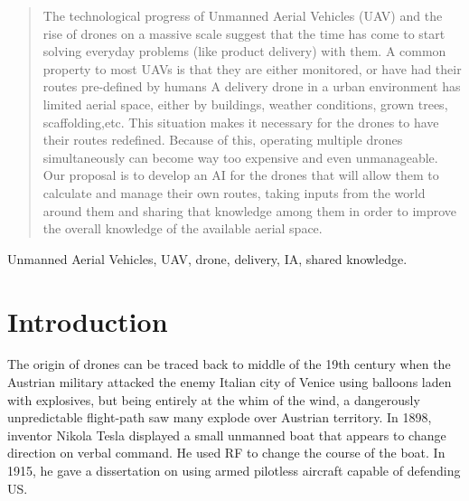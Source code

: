 \documentclass[conference]{IEEEtran}
\begin{document}


\maketitle

\begin{abstract}
The technological progress of Unmanned Aerial Vehicles (UAV) and the rise of drones on a massive scale suggest that the time has come to start solving everyday problems (like product delivery) with them.
A common property to most UAVs is that they are either monitored, or have had their routes pre-defined by humans
A delivery drone in a urban environment has limited aerial space, either by buildings, weather conditions, grown trees, scaffolding,etc.
This situation makes it necessary for the drones to have their routes redefined.
Because of this, operating multiple drones simultaneously can become way too expensive and even unmanageable.
Our proposal is to develop an AI for the drones that will allow them to calculate and manage their own routes, taking inputs from the world around them and sharing that knowledge among them in order to improve the overall knowledge of the available aerial space.
\end{abstract}


\begin{IEEEkeywords}
Unmanned Aerial Vehicles, UAV, drone, delivery, IA, shared knowledge.
\end{IEEEkeywords}


%
\IEEEpeerreviewmaketitle


\section{Introduction}


The origin of drones can be traced back to middle of the 19th century when the Austrian military attacked the enemy Italian city of Venice using balloons laden with explosives, but being entirely at the whim of the wind, a dangerously unpredictable flight-path saw many explode over Austrian territory. In 1898, inventor Nikola Tesla displayed a small unmanned boat that appears to change direction on verbal command. He used RF to change the course of the boat. In 1915, he gave a dissertation on using armed pilotless aircraft capable of defending US.\\
\end{document}

